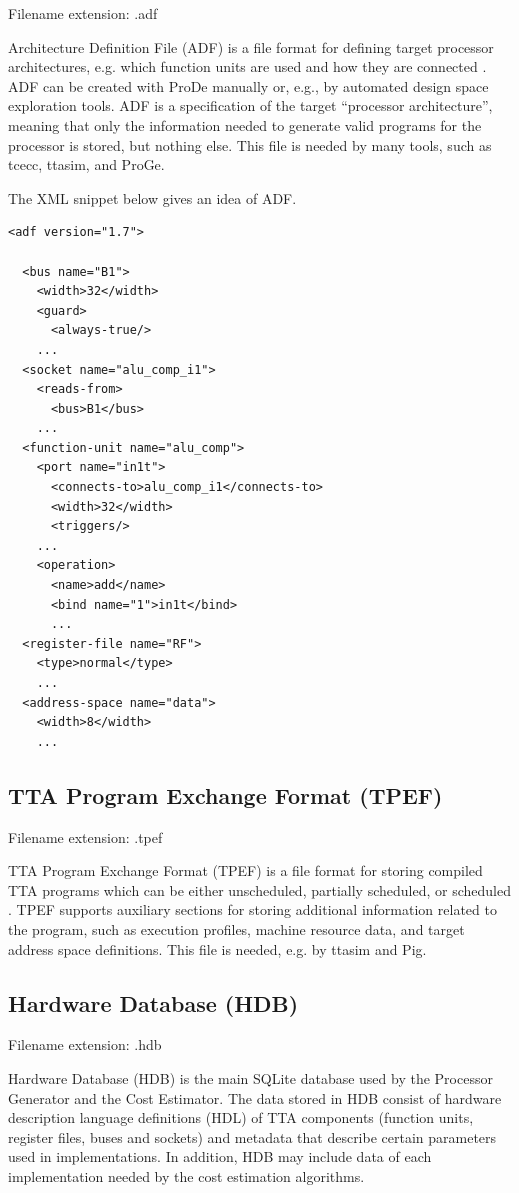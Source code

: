 \documentclass[twoside]{tceusermanual}
\begin{document}
Filename extension: .adf

Architecture Definition File (ADF) is a file format for
defining target processor architectures, e.g. which function units are
used and how they are connected \cite{ADF-specs}.  ADF can be created with
ProDe manually or, e.g., by automated design space exploration tools. ADF 
is a specification of the target ``processor architecture'', meaning that only 
the information needed to generate valid programs for the processor is stored, 
but nothing else. This file is needed by many tools, such as tcecc, ttasim, and ProGe.

The XML snippet below gives an idea of ADF.
\begin{verbatim}
<adf version="1.7">

  <bus name="B1">
    <width>32</width>
    <guard>
      <always-true/>
    ...
  <socket name="alu_comp_i1">
    <reads-from>
      <bus>B1</bus>
    ...
  <function-unit name="alu_comp">
    <port name="in1t">
      <connects-to>alu_comp_i1</connects-to>
      <width>32</width>
      <triggers/>
    ...
    <operation>
      <name>add</name>
      <bind name="1">in1t</bind>
      ...
  <register-file name="RF">
    <type>normal</type>
    ...
  <address-space name="data">
    <width>8</width>
    ...
\end{verbatim}

\subsection{TTA Program Exchange Format (TPEF)}
\label{section:TPEF}

Filename extension: .tpef

TTA Program Exchange Format (TPEF) is a file format for storing
compiled TTA programs which can be either unscheduled, partially
scheduled, or scheduled
\cite{TPEF-specs}. TPEF supports auxiliary sections for storing
additional information related to the program, such as execution
profiles, machine resource data, and target address space definitions.
This file is needed, e.g.  by ttasim and Pig.

\subsection{Hardware Database (HDB)}
\label{section:hdb}
Filename extension: .hdb

Hardware Database (HDB) is the main SQLite database used by the
Processor Generator and the Cost Estimator.  The data stored in HDB consist
of hardware description language definitions (HDL) of TTA components
(function units, register files, buses and sockets) and metadata that
describe certain parameters used in implementations. In addition, HDB may
include data of each implementation needed by the cost estimation
algorithms.
\end{document}
